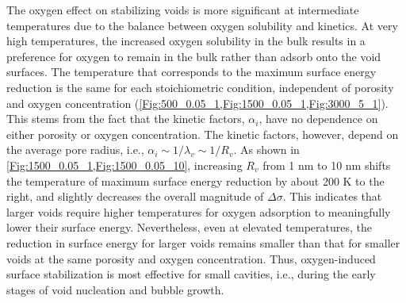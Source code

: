 \documentclass[preprint,12pt,sort&compress]{elsarticle}
\newcommand{\?}{\stackrel{?}{=}}
\begin{document}
The oxygen effect on stabilizing voids is more significant at intermediate temperatures due to the balance between oxygen solubility and kinetics. At very high temperatures, the increased oxygen solubility in the bulk results in a preference for oxygen to remain in the bulk rather than adsorb onto the void surfaces. The temperature that corresponds to the maximum surface energy reduction is the same for each stoichiometric condition, independent of porosity and oxygen concentration (\cref{Fig:500_0.05_1,Fig:1500_0.05_1,Fig:3000_5_1}). This stems from the fact that the kinetic factors, $\alpha_i$, have no dependence on either porosity or oxygen concentration. The kinetic factors, however, depend on the average pore radius, i.e., $\alpha_i \sim 1/\lambda_v \sim 1/R_v$. As shown in \cref{Fig:1500_0.05_1,Fig:1500_0.05_10}, increasing $R_v$ from 1 nm to 10 nm shifts the temperature of maximum surface energy reduction by about 200 K to the right, and slightly decreases the overall magnitude of $\Delta \sigma$. This indicates that larger voids require higher temperatures for oxygen adsorption to meaningfully lower their surface energy. Nevertheless, even at elevated temperatures, the reduction in surface energy for larger voids remains smaller than that for smaller voids at the same porosity and oxygen concentration. Thus, oxygen-induced surface stabilization is most effective for small cavities, i.e., during the early stages of void nucleation and bubble growth.

\end{document}
